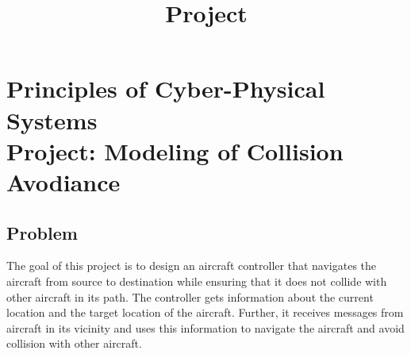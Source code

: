\documentclass[11pt]{article}
\title{Project}
\begin{document}
\section*{Principles of Cyber-Physical Systems\\
Project: Modeling of Collision Avodiance}

\subsection*{Problem}
The goal of this project is to design an aircraft controller that navigates the aircraft from source to destination while ensuring that it does not collide with other aircraft in its path. 
The controller gets information about the current location and the target location of the aircraft. 
Further, it receives messages from aircraft in its vicinity and uses this information to navigate the aircraft and avoid collision with other aircraft. 
\end{document}
